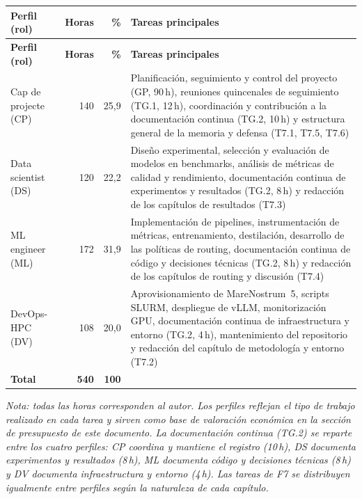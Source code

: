 \documentclass[11pt,a4paper]{article}
\begin{document}
{\footnotesize
\begin{tabularx}{\textwidth}{l r r >{\raggedright\arraybackslash}X}
\caption{Distribución de horas por perfil profesional. Elaboración propia.}\label{tab:roles}\\
\toprule
\textbf{Perfil (rol)} & \textbf{Horas} & \textbf{\%} & \textbf{Tareas principales} \\
\midrule
\endfirsthead
\toprule
\textbf{Perfil (rol)} & \textbf{Horas} & \textbf{\%} & \textbf{Tareas principales} \\
\midrule
\endhead
\bottomrule
\endlastfoot
Cap de projecte (CP) & 140 & 25,9 & Planificación, seguimiento y control del proyecto (GP, 90\,h), reuniones quincenales de seguimiento (TG.1, 12\,h), coordinación y contribución a la documentación continua (TG.2, 10\,h) y estructura general de la memoria y defensa (T7.1, T7.5, T7.6) \\
Data scientist (DS) & 120 & 22,2 & Diseño experimental, selección y evaluación de modelos en benchmarks, análisis de métricas de calidad y rendimiento, documentación continua de experimentos y resultados (TG.2, 8\,h) y redacción de los capítulos de resultados (T7.3) \\
ML engineer (ML) & 172 & 31,9 & Implementación de pipelines, instrumentación de métricas, entrenamiento, destilación, desarrollo de las políticas de routing, documentación continua de código y decisiones técnicas (TG.2, 8\,h) y redacción de los capítulos de routing y discusión (T7.4) \\
DevOps-HPC (DV) & 108 & 20,0 & Aprovisionamiento de MareNostrum~5, scripts SLURM, despliegue de vLLM, monitorización GPU, documentación continua de infraestructura y entorno (TG.2, 4\,h), mantenimiento del repositorio y redacción del capítulo de metodología y entorno (T7.2) \\
\midrule
\textbf{Total} & \textbf{540} & \textbf{100} & \\
\end{tabularx}
}

\noindent\textit{\footnotesize Nota: todas las horas corresponden al autor. Los perfiles reflejan el tipo de trabajo realizado en cada tarea y sirven como base de valoración económica en la sección de presupuesto de este documento. La documentación continua (TG.2) se reparte entre los cuatro perfiles: CP coordina y mantiene el registro (10\,h), DS documenta experimentos y resultados (8\,h), ML documenta código y decisiones técnicas (8\,h) y DV documenta infraestructura y entorno (4\,h). Las tareas de F7 se distribuyen igualmente entre perfiles según la naturaleza de cada capítulo.}
\end{document}
